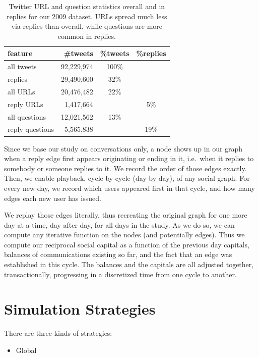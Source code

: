 \documentclass[10pt,oneside]{memoir}
\begin{document}
\begin{Spacing}{2}
\begin{table}
\begin{tabular}{|lrcc|}
\toprule
feature & \#tweets & \%tweets & \%replies \\
\midrule
all tweets & 92,229,974 & 100\% & \space\\
replies & 29,490,600 & 32\% & \space \\
all URLs & 20,476,482 &  22\% & \space \\
reply URLs & 1,417,664 & \space & 5\% \\
all questions & 12,021,562 & 13\% & \space \\
reply questions & 5,565,838 & \space & 19\% \\
\bottomrule
\end{tabular}
\label{table:reply-stats}
\caption{Twitter URL and question statistics overall and in replies for our 2009 dataset.  URLs spread much less via replies than overall, while questions are more common in replies.}
\end{table}
Since we base our study on conversations only, a node shows up in our graph when a reply edge first appears originating or ending in it, i.e.\ when it replies to somebody or someone replies to it.  We record the order of those edges exactly.
Then, we enable playback, cycle by cycle (day by day), of any social graph.  For every new day, we record which users appeared first in that cycle, and how many edges each new user has issued.


We replay those edges literally, thus recreating the original graph for one more day at a time, day after day, for all days in the study.  As we do so, we can compute any iterative function on the nodes (and potentially edges).  Thus we compute our reciprocal social capital as a function of the previous day capitals, balances of communications existing so far, and the fact that an edge was established in this cycle.  The balances and the capitals are all adjusted together, transactionally, progressing in a discretized time from one cycle to another.


\pagebreak \section{Simulation Strategies}
\label{simulationstrategies}

There are three kinds of strategies:


\begin{itemize}


\item Global


\end{itemize}
\end{Spacing}
\end{document}
